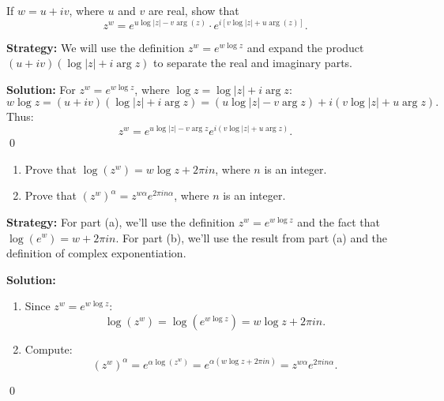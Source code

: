 \begin{problembox}
\begin{problemstatement}
If \( w = u + iv \), where \( u \) and \( v \) are real, show that
\[
z^w = e^{u \log |z| - v \arg(z)} \cdot e^{i[v \log |z| + u \arg(z)]}.
\]
\end{problemstatement}
\end{problembox}

\noindent\textbf{Strategy:} We will use the definition $z^w = e^{w \log z}$ and expand the product $(u + iv)(\log |z| + i \arg z)$ to separate the real and imaginary parts.

\bigskip\noindent\textbf{Solution:}
For \( z^w = e^{w \log z} \), where \( \log z = \log |z| + i \arg z \):
\[
w \log z = (u + iv)(\log |z| + i \arg z) = (u \log |z| - v \arg z) + i(v \log |z| + u \arg z).
\]
Thus:
\[
z^w = e^{u \log |z| - v \arg z} e^{i(v \log |z| + u \arg z)}.
\]\qed


\begin{problembox}
\begin{problemstatement}
\begin{enumerate}[label=\alph*)]
\item Prove that \( \log(z^w) = w \log z + 2\pi i n \), where \( n \) is an integer.
\item Prove that \( (z^w)^\alpha = z^{w\alpha} e^{2\pi i n \alpha} \), where \( n \) is an integer.
\end{enumerate}
\end{problemstatement}
\end{problembox}

\noindent\textbf{Strategy:} For part (a), we'll use the definition $z^w = e^{w \log z}$ and the fact that $\log(e^w) = w + 2\pi i n$. For part (b), we'll use the result from part (a) and the definition of complex exponentiation.

\bigskip\noindent\textbf{Solution:}
\begin{enumerate}[label=\alph*)]
\item Since \( z^w = e^{w \log z} \):
\[
\log(z^w) = \log(e^{w \log z}) = w \log z + 2\pi i n.
\]
\item Compute:
\[
(z^w)^\alpha = e^{\alpha \log(z^w)} = e^{\alpha(w \log z + 2\pi i n)} = z^{w\alpha} e^{2\pi i n \alpha}.
\]
\end{enumerate}\qed


